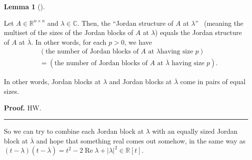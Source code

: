 \documentclass[numbers=enddot,12pt,final,onecolumn,notitlepage]{scrartcl}%
\numberwithin{exer}{subsection}
\theoremstyle{definition}
\newtheorem{lem}[theo]{Lemma}
\newenvironment{lemma}[1][]
{\begin{lem}[#1]\begin{leftbar}}
{\end{leftbar}\end{lem}}
\newenvironment{proof}[1][Proof]{\noindent\textbf{#1.} }{\ \rule{0.5em}{0.5em}}
\begin{document}
\begin{lemma}
Let $A\in\mathbb{R}^{n\times n}$ and $\lambda\in\mathbb{C}$. Then, the
\textquotedblleft Jordan structure of $A$ at $\lambda$\textquotedblright%
\ (meaning the multiset of the sizes of the Jordan blocks of $A$ at $\lambda$)
equals the Jordan structure of $A$ at $\overline{\lambda}$. In other words,
for each $p>0$, we have%
\begin{align*}
& \left(  \text{the number of Jordan blocks of }A\text{ at }\lambda\text{
having size }p\right)  \\
& =\left(  \text{the number of Jordan blocks of }A\text{ at }\overline
{\lambda}\text{ having size }p\right)  .
\end{align*}


In other words, Jordan blocks at $\lambda$ and Jordan blocks at $\overline
{\lambda}$ come in pairs of equal sizes.
\end{lemma}

\begin{proof}
HW.
\end{proof}

So we can try to combine each Jordan block at $\lambda$ with an equally sized
Jordan block at $\overline{\lambda}$ and hope that something real comes out
somehow, in the same way as $\left(  t-\lambda\right)  \left(  t-\overline
{\lambda}\right)  =t^{2}-2\operatorname*{Re}\lambda+\left\vert \lambda
\right\vert ^{2}\in\mathbb{R}\left[  t\right]  $.
\end{document}
